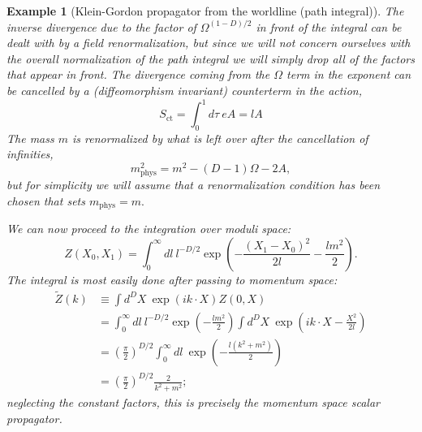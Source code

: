 \documentclass[10pt,
 article,
 amsmath,amssymb
]{revtex4-2}
\newtheorem{example}[theorem]{Example}
\begin{document}
\begin{example}[Klein-Gordon propagator from the worldline (path integral)]
The inverse divergence due to the factor of $\Omega^{(1-D)/2}$ in front of the integral can be dealt with by a field renormalization, but since we will not concern ourselves with the overall normalization of the path integral we will simply drop all of the factors that appear in front. The divergence coming from the $\Omega$ term in the exponent can be cancelled by a (diffeomorphism invariant) counterterm in the action,
$$S_{\mathrm{ct}}=\int_0^1d\tau\:eA=lA$$
The mass $m$ is renormalized by what is left over after the cancellation of infinities,
$$m_{\mathrm{phys}}^2=m^2-(D-1)\Omega-2A,$$
but for simplicity we will assume that a renormalization condition has been chosen that sets $m_\mathrm{phys}=m.$

We can now proceed to the integration over moduli space:
$$Z(X_0,X_1)=\int_0^\infty dl\:l^{-D/2}\exp\left(-\frac{(X_1-X_0)^2}{2l}-\frac{lm^2}{2}\right).$$
The integral is most easily done after passing to momentum space:
$$\begin{aligned}\tilde{Z}(k)&\equiv\int d^DX\:\exp\left(ik\cdot X\right)Z(0,X)\\&=\int_0^\infty dl\:l^{-D/2}\exp\left(-\frac{lm^2}2\right)\int d^DX\:\exp\left(ik\cdot X-\frac{X^2}{2l}\right)\\&=\left(\frac\pi2\right)^{D/2}\int_0^\infty dl\:\exp\left(-\frac{l(k^2+m^2)}2\right)\\&=\left(\frac\pi2\right)^{D/2}\frac2{k^2+m^2};\end{aligned}$$
neglecting the constant factors, this is precisely the momentum space scalar propagator.

\end{example}
\end{document}
